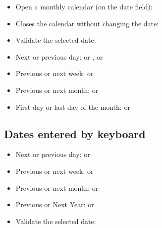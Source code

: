 \begin{itemize}
	\item Open a monthly calendar (on the date field): %
	\item Closes the calendar without changing the date: %
	\item Validate the selected date: %
	\item Next or previous day: \keys{{+}} or \keys{{-}}, \keys{\arrowkeyright} or \keys{\arrowkeyleft}%
	\item Previous or next week: \keys{\arrowkeyup} or \keys{\arrowkeydown}%
	\item Previous or next month:  or %
	\item First day or last day of the month:  or %
\end{itemize}

\subsection{Dates entered by keyboard}

\begin{itemize}
	\item Next or previous day: \keys{{+}} or \keys{{-}}%
	\item Previous or next week:  or %
	\item Previous or next month:  or %
	\item Previous or Next Year:  or %
	\item Validate the selected date: %
\end{itemize}


